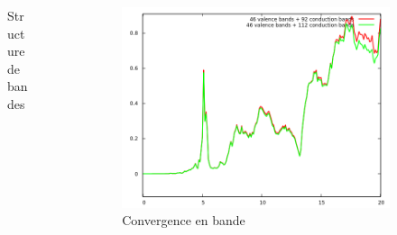 \documentclass[french]{beamer}
\begin{document}
\begin{frame}
\begin{columns}
\begin{column}{\paperwidth-10pt}
\begin{figure}[!h]
    \caption{\centering Structure de bandes}\label{fig-band_2}
    \end{figure}
  \end{column}
  \begin{column}{\paperwidth-10pt}
    \begin{figure}[!h]
    \centering
    \includegraphics[width=\textwidth]{nbd_2}
    \caption{Convergence en bande}\label{fig-cv_nbd_2}
    \end{figure}
  \end{column}
\end{columns}

\end{frame}
\end{document}

